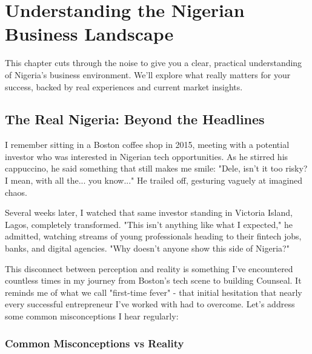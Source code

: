 
\chapter{Understanding the Nigerian Business Landscape}

\begin{importantbox}
This chapter cuts through the noise to give you a clear, practical understanding of Nigeria's business environment. We'll explore what really matters for your success, backed by real experiences and current market insights.
\end{importantbox}

\section{The Real Nigeria: Beyond the Headlines}

I remember sitting in a Boston coffee shop in 2015, meeting with a potential investor who was interested in Nigerian tech opportunities. As he stirred his cappuccino, he said something that still makes me smile: "Dele, isn't it too risky? I mean, with all the... you know..." He trailed off, gesturing vaguely at imagined chaos.

Several weeks later, I watched that same investor standing in Victoria Island, Lagos, completely transformed. "This isn't anything like what I expected," he admitted, watching streams of young professionals heading to their fintech jobs, banks, and digital agencies. "Why doesn't anyone show this side of Nigeria?"

This disconnect between perception and reality is something I've encountered countless times in my journey from Boston's tech scene to building Counseal. It reminds me of what we call "first-time fever" - that initial hesitation that nearly every successful entrepreneur I've worked with had to overcome. Let's address some common misconceptions I hear regularly:


\subsection{Common Misconceptions vs Reality}

